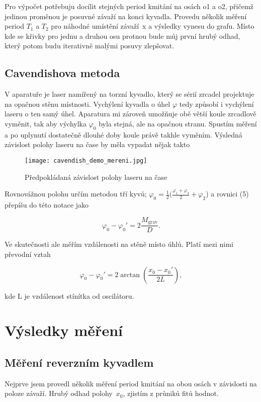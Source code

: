 \documentclass[a4paper,11pt]{article}
\begin{document}
Pro výpočet potřebuju docílit stejných period kmitání na osách o1 a o2, přičemž jedinou proměnou je posuvné závaží na konci kyvadla. Provedu několik měření period $T_1$ a $T_2$ pro náhodné umístění závaží~x a výsledky vynesu do grafu. Místo kde se křivky pro jednu a druhou osu protnou bude můj první hrubý odhad, který potom budu iterativně malými posuvy zlepšovat.

\subsection{Cavendishova metoda}

V aparatuře je laser namířený na torzní kyvadlo, který se sérií zrcadel projektuje na opačnou stěnu místnosti. Vychýlení kyvadla o úhel $\varphi$ tedy způsobí i vychýlení laseru o ten samý úhel. Aparatura mi zároveň umožňuje obě větší koule zrcadlově vyměnit, tak aby výchylka $\varphi_0$ byla stejná, ale na opačnou stranu. Spustím měření a po uplynutí dostatečně dlouhé doby koule právě takhle vyměním. Výsledná závislost polohy laseru na čase by měla vypadat nějak takto

\begin{figure}[htpb]
  \centering
  \texttt{[image: cavendish\_demo\_mereni.jpg]}
  \caption{Předpokládaná závislost polohy laseru na čase}
\end{figure}

\newpage

Rovnovážnou polohu určím metodou tří kyvů; $\varphi_0 = \frac{1}{2}(\frac{\varphi_1 + \varphi_3}{2} + \varphi_2$) a rovnici (5) přepíšu do této notace jako

\begin{equation}
\varphi_0 - \varphi_0' = 2 \frac{M_{\text{grav}}}{D}.
\end{equation}

Ve skutečnosti ale měřím vzdálenosti na stěně místo úhlů. Platí mezi nimi převodní vztah

\begin{equation}
\varphi_0 - \varphi_0' = 2\arctan(\frac{x_0 - x_0'}{2L}),
\end{equation}

\noindent
kde L je vzdálenost stínítka od oscilátoru.

\section{Výsledky měření}

\subsection{Měření reverzním kyvadlem}
Nejprve jsem provedl několik měření period kmitání na obou osách v závislosti na poloze závaží. Hrubý odhad polohy~$x_0$, zjistím z průniků fitů hodnot.
\end{document}
